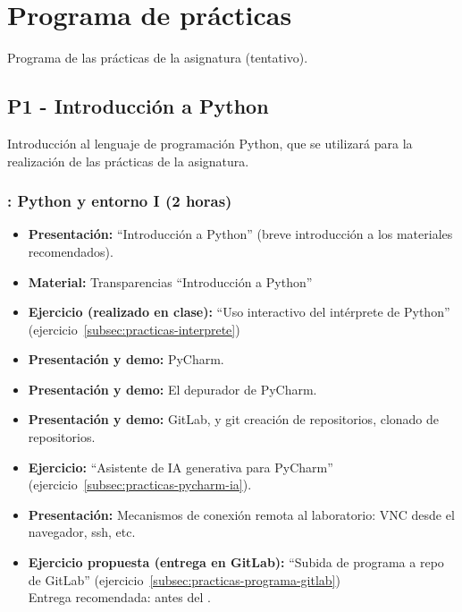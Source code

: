 \documentclass[a4paper,12pt]{article}
\begin{document}
\section{Programa de prácticas}

Programa de las prácticas de la asignatura (tentativo).

\subsection{P1 - Introducción a Python}

Introducción al lenguaje de programación Python, que se utilizará para la realización de las prácticas de la asignatura.

\subsubsection{\juevesA: Python y entorno I  (2 horas)}
\label{cal:juevesA}

\begin{itemize}
\item \textbf{Presentación:} ``Introducción a Python'' (breve introducción a los materiales recomendados).
\item \textbf{Material:} Transparencias ``Introducción a Python''
\item \textbf{Ejercicio (realizado en clase):} ``Uso interactivo del intérprete de Python'' (ejercicio~\ref{subsec:practicas-interprete})
\item \textbf{Presentación y demo:} PyCharm.
\item \textbf{Presentación y demo:} El depurador de PyCharm.
\item \textbf{Presentación y demo:} GitLab, y git creación de repositorios, clonado de repositorios.
\item \textbf{Ejercicio:} ``Asistente de IA generativa para PyCharm'' (ejercicio~\ref{subsec:practicas-pycharm-ia}).
\item \textbf{Presentación:} Mecanismos de conexión remota al laboratorio: VNC desde el navegador, ssh, etc.
\item \textbf{Ejercicio propuesta (entrega en GitLab):} ``Subida de programa a repo de GitLab'' (ejercicio~\ref{subsec:practicas-programa-gitlab}) \\
   Entrega recomendada: antes del \juevesB.
\end{itemize}
\end{document}

